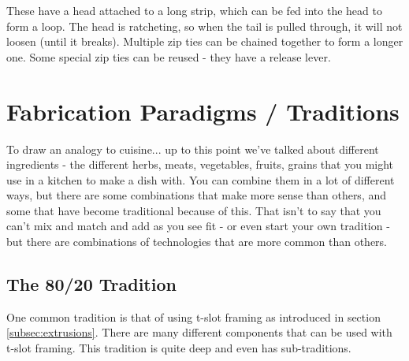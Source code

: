 	These have a head attached to a long strip, which can be fed into the head to form a loop. The head is ratcheting, so when the tail is pulled through, it will not loosen (until it breaks). Multiple zip ties can be chained together to form a longer one. Some special zip ties can be reused - they have a release lever.

	\section{Fabrication Paradigms / Traditions}
	To draw an analogy to cuisine... up to this point we've talked about different ingredients - the different herbs, meats, vegetables, fruits, grains that you might use in a kitchen to make a dish with. You can combine them in a lot of different ways, but there are some combinations that make more sense than others, and some that have become traditional because of this. That isn't to say that you can't mix and match and add as you see fit - or even start your own tradition - but there are combinations of technologies that are more common than others. 
	
	\subsection{The 80/20 Tradition}
	One common tradition is that of using t-slot framing as introduced in section \ref{subsec:extrusions}. There are many different components that can be used with t-slot framing. This tradition is quite deep and even has sub-traditions.
	
